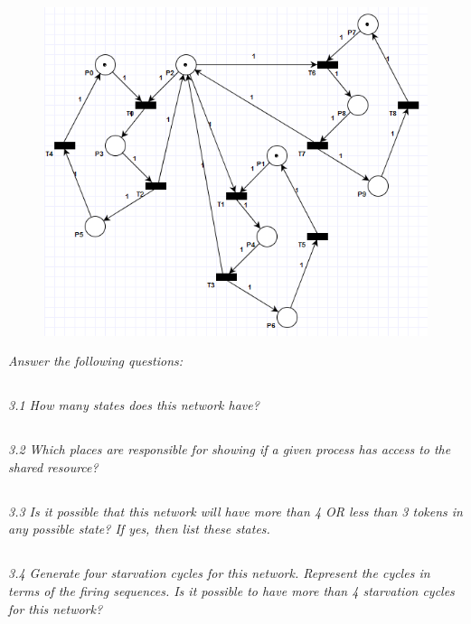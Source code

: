 \documentclass[letterpaper]{article}
\begin{document}
\begin{figure}[H]
 \centering
 \includegraphics[width=\textwidth]{image4.png}
\end{figure}

\textit{Answer the following questions:}

\subsection{}
\textit{3.1  How many states does this network have?
}

\subsection{}
\textit{3.2  Which places are responsible for showing if a given process has access to the shared resource?}

\subsection{}
\textit{3.3  Is it possible that this network will have more than 4 OR less than 3 tokens in any possible state?
 If yes, then list these states.
}

\subsection{}
\textit{3.4  Generate four starvation cycles for this network. Represent the cycles in terms of the firing sequences. Is it possible to have more than 4 starvation cycles for this network?}
\end{document}
